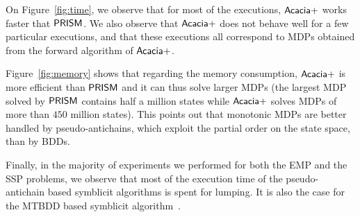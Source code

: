 On Figure~\ref{fig:time}, we observe that for most of the executions, $\sf{Acacia+}$ works faster that $\sf{PRISM}$. We also observe that  $\sf{Acacia+}$ does not behave well for a few particular executions, and that these executions all correspond to MDPs obtained from the forward algorithm of $\sf{Acacia+}$.

Figure~\ref{fig:memory} shows that regarding the memory consumption, $\sf{Acacia+}$ is  more efficient than $\sf{PRISM}$ and it can thus solve larger MDPs (the largest MDP solved by $\sf{PRISM}$ contains half a million states while $\sf{Acacia+}$ solves MDPs of more than $450$ million states). This points out that monotonic MDPs are better handled by pseudo-antichains, which exploit the partial order on the state space, than by BDDs.

\medskip
Finally, in the majority of experiments we performed for both the EMP and the SSP problems, we observe that most of the execution time of the pseudo-antichain based symblicit algorithms is spent for lumping. It is also the case for the MTBDD based symblicit algorithm~\cite{DBLP:conf/qest/WimmerBBHCHDT10}.
